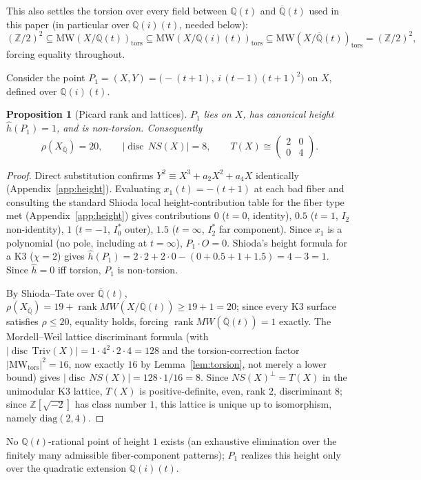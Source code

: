 \documentclass[11pt]{amsart}
\newtheorem{proposition}[theorem]{Proposition}
\theoremstyle{definition}
\newcommand{\Q}{\mathbb{Q}}
\newcommand{\Z}{\mathbb{Z}}
\newcommand{\Qbar}{\overline{\mathbb{Q}}}
\newcommand{\Triv}{\mathrm{Triv}}
\DeclareMathOperator{\disc}{disc}
\DeclareMathOperator{\rk}{rank}
\begin{document}
This also settles the torsion over every field between $\Q(t)$ and $\Qbar(t)$ used in this paper (in particular over $\Q(i)(t)$, needed below):
\[
(\Z/2)^2\subseteq\mathrm{MW}(X/\Q(t))_{\mathrm{tors}}\subseteq\mathrm{MW}(X/\Q(i)(t))_{\mathrm{tors}}\subseteq\mathrm{MW}(X/\Qbar(t))_{\mathrm{tors}}=(\Z/2)^2,
\]
forcing equality throughout.

Consider the point $P_1=(X,Y)=\bigl(-(t+1),\ i\,(t-1)(t+1)^2\bigr)$ on $X$, defined over $\Q(i)(t)$.

\begin{proposition}[Picard rank and lattices]
\label{prop:picard}
$P_1$ lies on $X$, has canonical height $\hat h(P_1)=1$, and is non-torsion. Consequently
\[
\rho(X_{\Qbar})=20,\qquad |\disc\,NS(X)|=8,\qquad T(X)\cong\begin{pmatrix}2&0\\0&4\end{pmatrix}.
\]
\end{proposition}

\begin{proof}
Direct substitution confirms $Y^2\equiv X^3+a_2X^2+a_4X$ identically (Appendix~\ref{app:height}). Evaluating $x_1(t)=-(t+1)$ at each bad fiber and consulting the standard Shioda local height-contribution table for the fiber type met (Appendix~\ref{app:height}) gives contributions $0$ ($t=0$, identity), $0.5$ ($t=1$, $I_2$ non-identity), $1$ ($t=-1$, $I_0^*$ outer), $1.5$ ($t=\infty$, $I_2^*$ far component). Since $x_1$ is a polynomial (no pole, including at $t=\infty$), $P_1\cdot O=0$. Shioda's height formula for a K3 ($\chi=2$) gives $\hat h(P_1)=2\cdot2+2\cdot0-(0+0.5+1+1.5)=4-3=1$. Since $\hat h=0$ iff torsion, $P_1$ is non-torsion.

By Shioda--Tate over $\Qbar(t)$, $\rho(X_{\Qbar})=19+\rk MW(X/\Qbar(t))\ge19+1=20$; since every K3 surface satisfies $\rho\le20$, equality holds, forcing $\rk MW(\Qbar(t))=1$ exactly. The Mordell--Weil lattice discriminant formula (with $|\disc\,\Triv(X)|=1\cdot4^2\cdot2\cdot4=128$ and the torsion-correction factor $|\mathrm{MW}_{\mathrm{tors}}|^2=16$, now exactly $16$ by Lemma~\ref{lem:torsion}, not merely a lower bound) gives $|\disc\,NS(X)|=128\cdot1/16=8$. Since $NS(X)^\perp=T(X)$ in the unimodular K3 lattice, $T(X)$ is positive-definite, even, rank $2$, discriminant $8$; since $\Z[\sqrt{-2}]$ has class number $1$, this lattice is unique up to isomorphism, namely $\mathrm{diag}(2,4)$.
\end{proof}

No $\Q(t)$-rational point of height $1$ exists (an exhaustive elimination over the finitely many admissible fiber-component patterns); $P_1$ realizes this height only over the quadratic extension $\Q(i)(t)$.
\end{document}
